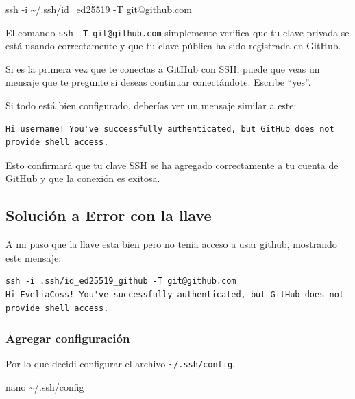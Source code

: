 \documentclass[
  spanish,
  12pt,
  letterpaper,
  DIV=11,
  numbers=noendperiod]{scrreprt}
\newenvironment{Shaded}{\begin{snugshade}}{\end{snugshade}}
\newcommand{\AttributeTok}[1]{\textcolor[rgb]{0.40,0.45,0.13}{#1}}
\newcommand{\FunctionTok}[1]{\textcolor[rgb]{0.28,0.35,0.67}{#1}}
\newcommand{\NormalTok}[1]{\textcolor[rgb]{0.00,0.23,0.31}{#1}}
\begin{document}
\begin{Shaded}
\begin{Highlighting}[]
\FunctionTok{ssh} \AttributeTok{{-}i}\NormalTok{ \textasciitilde{}/.ssh/id\_ed25519 }\AttributeTok{{-}T}\NormalTok{ git@github.com}
\end{Highlighting}
\end{Shaded}

El comando \texttt{ssh\ -T\ git@github.com} simplemente verifica que tu
clave privada se está usando correctamente y que tu clave pública ha
sido registrada en GitHub.

Si es la primera vez que te conectas a GitHub con SSH, puede que veas un
mensaje que te pregunte si deseas continuar conectándote. Escribe
``yes''.

Si todo está bien configurado, deberías ver un mensaje similar a este:

\begin{verbatim}
Hi username! You've successfully authenticated, but GitHub does not provide shell access.
\end{verbatim}

Esto confirmará que tu clave SSH se ha agregado correctamente a tu
cuenta de GitHub y que la conexión es exitosa.

\subsection{Solución a Error con la
llave}\label{soluciuxf3n-a-error-con-la-llave}

A mi paso que la llave esta bien pero no tenia acceso a usar github,
mostrando este mensaje:

\begin{verbatim}
ssh -i .ssh/id_ed25519_github -T git@github.com
Hi EveliaCoss! You've successfully authenticated, but GitHub does not provide shell access.
\end{verbatim}

\subsubsection{Agregar configuración}\label{agregar-configuraciuxf3n-1}

Por lo que decidi configurar el archivo
\texttt{\textasciitilde{}/.ssh/config}.

\begin{Shaded}
\begin{Highlighting}[]
\FunctionTok{nano}\NormalTok{ \textasciitilde{}/.ssh/config}
\end{Highlighting}
\end{Shaded}
\end{document}
